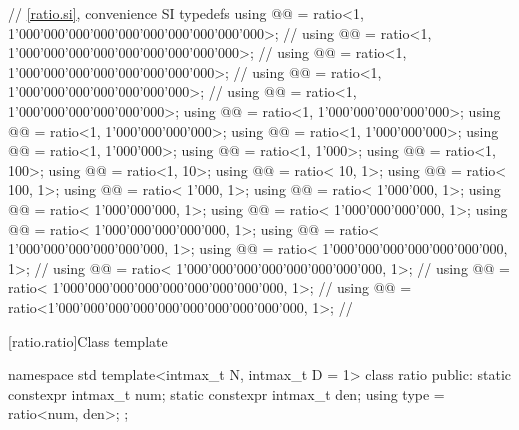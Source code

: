 \begin{codeblockdigitsep}
{  // \ref{ratio.si}, convenience SI typedefs
  using @@ = ratio<1, 1'000'000'000'000'000'000'000'000'000'000>;     // \seebelow
  using @@  = ratio<1,     1'000'000'000'000'000'000'000'000'000>;     // \seebelow
  using @@  = ratio<1,         1'000'000'000'000'000'000'000'000>;     // \seebelow
  using @@  = ratio<1,             1'000'000'000'000'000'000'000>;     // \seebelow
  using @@   = ratio<1,                 1'000'000'000'000'000'000>;
  using @@  = ratio<1,                     1'000'000'000'000'000>;
  using @@   = ratio<1,                         1'000'000'000'000>;
  using @@   = ratio<1,                             1'000'000'000>;
  using @@  = ratio<1,                                 1'000'000>;
  using @@  = ratio<1,                                     1'000>;
  using @@  = ratio<1,                                       100>;
  using @@   = ratio<1,                                        10>;
  using @@   = ratio<                                       10, 1>;
  using @@  = ratio<                                      100, 1>;
  using @@   = ratio<                                    1'000, 1>;
  using @@   = ratio<                                1'000'000, 1>;
  using @@   = ratio<                            1'000'000'000, 1>;
  using @@   = ratio<                        1'000'000'000'000, 1>;
  using @@   = ratio<                    1'000'000'000'000'000, 1>;
  using @@    = ratio<                1'000'000'000'000'000'000, 1>;
  using @@  = ratio<            1'000'000'000'000'000'000'000, 1>;     // \seebelow
  using @@  = ratio<        1'000'000'000'000'000'000'000'000, 1>;     // \seebelow
  using @@  = ratio<    1'000'000'000'000'000'000'000'000'000, 1>;     // \seebelow
  using @@ = ratio<1'000'000'000'000'000'000'000'000'000'000, 1>;     // \seebelow
}
\end{codeblockdigitsep}

[ratio.ratio]{Class template }

%
\begin{codeblock}
namespace std {
  template<intmax_t N, intmax_t D = 1> class ratio {
  public:
    static constexpr intmax_t num;
    static constexpr intmax_t den;
    using type = ratio<num, den>;
  };
}
\end{codeblock}

